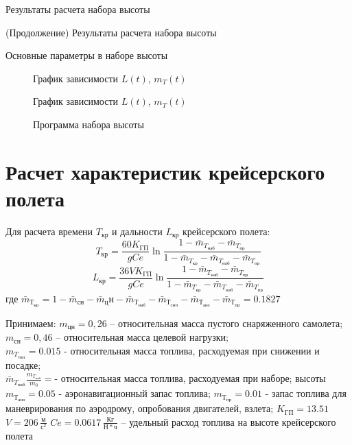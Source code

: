 \begin{sidewaystable}
    \centering
    \caption{Результаты расчета набора высоты}
    \label{tab:result_climb}
    
    \centering
    \caption{(Продолжение) Результаты расчета набора высоты}
    \label{tab:result_climb_2}
    
    \caption{Основные параметры в наборе высоты}
    
    \label{tab:minitable_climb}
\end{sidewaystable}

\begin{figure}[H]
\centering
\resizebox{.79\linewidth}{!}{}
\caption{График зависимости $L(t)$, $m_{T}(t)$}
\label{fig:climb_params}
\end{figure}

\begin{figure}[H]
\centering
\resizebox{.79\linewidth}{!}{}
\caption{График зависимости $L(t)$, $m_{T}(t)$}
\label{fig:L_t_climb}
\end{figure}
 
\begin{figure}[H]
\centering
\resizebox{.79\linewidth}{!}{}
\caption{Программа набора высоты}
\label{fig:H_M_des}
\end{figure}

\section{Расчет характеристик крейсерского полета}

Для расчета времени $T_{кр}$ и дальности $L_{кр}$ крейсерского полета:
\begin{equation}
T_{кр} = \frac{60 K_{ГП}}{gCe} \ln{\frac{1 - \bar{m}_{T_{наб}} - \bar{m}_{T_{пр}}}{1 - \bar{m}_{T_{кр}}-\bar{m}_{T_{наб}}-\bar{m}_{T_{пр}}}}
\end{equation}
\begin{equation}
L_{кр} = \frac{36 V K_{ГП}}{gCe} \ln{\frac{1 - \bar{m}_{T_{наб}} - \bar{m}_{T_{пр}}}{1 - \bar{m}_{T_{кр}}-\bar{m}_{T_{наб}}-\bar{m}_{T_{пр}}}}
\end{equation}
где $\bar{m}_{Т_{кр}} = 1 - \bar{m}_{сн} - \bar{m}_цн - \bar{m}_{Т_{наб}} -
\bar{m}_{Т_{снп}} - \bar{m}_{Т_{анз}} - \bar{m}_{Т_{пр}} = 0.1827$ 

Принимаем:
$m_{цн} = 0,26$ – относительная масса пустого снаряженного самолета;\\
$m_{сн} =0,46$ – относительная масса целевой нагрузки;\\
$m_{T_{cнп}} =0.015$ - относительная масса топлива, расходуемая при снижении и
посадке;\\
$\bar{m}_{T_{наб}} \frac{m_{T_{наб}}}{m_0} = $- относительная масса топлива, расходуемая при наборе;
высоты\\
$m_{Т_{анз}} = 0.05$ - аэронавигационный запас топлива;
$m_{Т_{пр}} = 0.01$ - запас топлива для маневрирования по аэродрому, опробования
двигателей, взлета;
$K_{ГП} = 13.51$
$V = 206\, \frac{м}{с^2}$
$Ce= 0.0617\, \frac{Кг}{Н*ч} $ – удельный расход топлива на высоте крейсерского
полета

